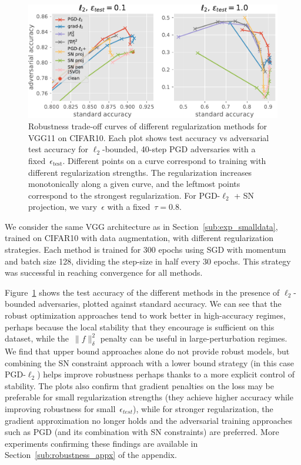 \begin{figure}[tb]
	\centering
	\includegraphics[width=.95\columnwidth]{figures/cifar10_vgg/test_vs_adv_l2_comp.pdf}
        \vspace*{-0.1cm}
	\caption{Robustness trade-off curves of different regularization methods for VGG11 on CIFAR10.
	Each plot shows test accuracy vs adversarial test accuracy
	for $\ell_2$-bounded, 40-step PGD adversaries with a fixed~$\epsilon_{\text{test}}$.
	Different points on a curve correspond to training with different regularization strengths.
	The regularization increases monotonically along a given curve, and
	the leftmost points correspond to the strongest regularization.
	For PGD-$\ell_2$ + SN projection, we vary~$\epsilon$ with a fixed~$\tau = 0.8$.
	}
	\label{fig:robust_tradeoffs}
        \vspace*{-0.2cm}
\end{figure}

We consider the same VGG architecture as in Section~\ref{sub:exp_smalldata}, trained on CIFAR10
with data augmentation, with different regularization strategies.
Each method is trained for 300 epochs using SGD with momentum and batch size 128, dividing the step-size in half every 30 epochs.
This strategy was successful in reaching convergence for all methods.

Figure~\ref{fig:robust_tradeoffs} shows the test accuracy of the different methods in the presence
of $\ell_2$-bounded adversaries, plotted against standard accuracy.
We can see that the robust optimization approaches tend to work better in high-accuracy regimes, perhaps because the local stability that they encourage is sufficient on this dataset,
while the~$\|f\|_\delta^2$
penalty can be useful in large-perturbation regimes.
We find that upper bound approaches alone do not provide robust models,
but combining the SN constraint approach with a lower bound strategy
(in this case PGD-$\ell_2$) helps improve robustness perhaps thanks to a more explicit control of stability.
The plots also confirm that gradient penalties on the loss may be preferable for small regularization strengths (they achieve higher accuracy while improving robustness for small~$\epsilon_{test}$),
while for stronger regularization,
the gradient approximation no longer holds and the adversarial training approaches such
as PGD (and its combination with SN constraints) are preferred.
More experiments confirming these findings are available in Section~\ref{sub:robustness_appx} of the appendix.

